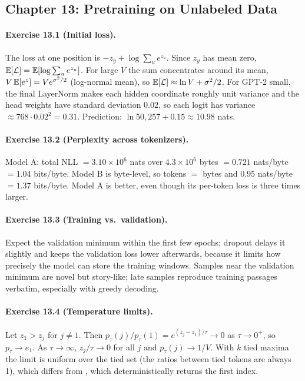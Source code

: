 \subsection*{Chapter 13: Pretraining on Unlabeled Data}

\paragraph{Exercise 13.1 (Initial loss).}
The loss at one position is $-z_y+\log\sum_u e^{z_u}$. Since $z_y$ has mean zero,
$\mathbb{E}[\mathcal L]=\mathbb{E}[\log\sum_u e^{z_u}]$. For large $V$ the sum concentrates around its mean,
$V\,\mathbb{E}[e^{z}]=V e^{\sigma^2/2}$ (log-normal mean), so $\mathbb{E}[\mathcal L]\approx\ln V+\sigma^2/2$.
For GPT-2 small, the final LayerNorm makes each hidden coordinate roughly unit variance and the
head weights have standard deviation $0.02$, so each logit has variance
$\approx768\cdot0.02^2=0.31$. Prediction: $\ln 50{,}257+0.15\approx10.98$ nats.

\paragraph{Exercise 13.2 (Perplexity across tokenizers).}
Model A: total NLL $=3.10\times10^6$ nats over $4.3\times10^6$ bytes $=0.721$ nats/byte $=1.04$
bits/byte. Model B is byte-level, so tokens $=$ bytes and $0.95$ nats/byte $=1.37$ bits/byte.
Model A is better, even though its per-token loss is three times larger.

\paragraph{Exercise 13.3 (Training vs.\ validation).}
Expect the validation minimum within the first few epochs; dropout delays it slightly and
keeps the validation loss lower afterwards, because it limits how precisely the model can store
the training windows. Samples near the validation minimum are novel but story-like; late samples
reproduce training passages verbatim, especially with greedy decoding.

\paragraph{Exercise 13.4 (Temperature limits).}
Let $z_1>z_j$ for $j\neq1$. Then $p_\tau(j)/p_\tau(1)=e^{(z_j-z_1)/\tau}\to0$ as $\tau\to0^+$,
so $p_\tau\to e_1$. As $\tau\to\infty$, $z_j/\tau\to0$ for all $j$ and $p_\tau(j)\to1/V$. With
$k$ tied maxima the limit is uniform over the tied set (the ratios between tied tokens are always
1), which differs from , which deterministically returns the first index.

